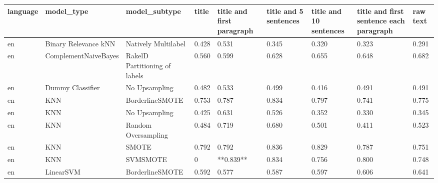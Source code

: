 \begin{tabular}{lllllllll}
\toprule
language &                      model\_type &                 model\_subtype & title & title and first paragraph & title and 5 sentences & title and 10 sentences & title and first sentence each paragraph &  raw text \\
\midrule
      en &            Binary Relevance kNN &           Natively Multilabel & 0.428 &                     0.531 &                 0.345 &                  0.320 &                                   0.323 &     0.291 \\
      en &            ComplementNaiveBayes & RakelD Partitioning of labels & 0.560 &                     0.599 &                 0.628 &                  0.655 &                                   0.648 &     0.682 \\
      en &                Dummy Classifier &                 No Upsampling & 0.482 &                     0.533 &                 0.499 &                  0.416 &                                   0.491 &     0.491 \\
      en &                             KNN &               BorderlineSMOTE & 0.753 &                     0.787 &                 0.834 &                  0.797 &                                   0.741 &     0.775 \\
      en &                             KNN &                 No Upsampling & 0.425 &                     0.631 &                 0.526 &                  0.352 &                                   0.330 &     0.345 \\
      en &                             KNN &           Random Oversampling & 0.484 &                     0.719 &                 0.680 &                  0.501 &                                   0.411 &     0.523 \\
      en &                             KNN &                         SMOTE & 0.792 &                     0.792 &                 0.836 &                  0.829 &                                   0.787 &     0.751 \\
      en &                             KNN &                      SVMSMOTE &     0 &                 **0.839** &                 0.834 &                  0.756 &                                   0.800 &     0.748 \\
      en &                       LinearSVM &               BorderlineSMOTE & 0.592 &                     0.577 &                 0.587 &                  0.597 &                                   0.606 &     0.641 \\

\end{tabular}
